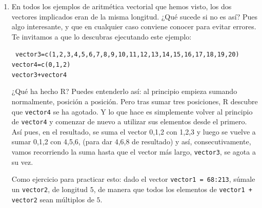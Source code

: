\documentclass[10pt,a4paper]{article}\usepackage[]{graphicx}\usepackage[]{color}
\begin{document}
\begin{enumerate}
  \addtocounter{enumi}{27}
  \item En todos los ejemplos de aritmética vectorial que hemos visto, los dos vectores implicados eran de la misma longitud. ¿Qué sucede si no es así? Pues algo interesante, y que en cualquier caso conviene conocer para evitar errores. Te invitamos a que lo descubras ejecutando este ejemplo:
    \begin{center}
    \begin{minipage}{12cm}
    {\tt
    vector3=c(1,2,3,4,5,6,7,8,9,10,11,12,13,14,15,16,17,18,19,20)\\
    vector4=c(0,1,2)\\
    vector3+vector4
    }
    \end{minipage}
    \end{center}
    ¿Qué ha hecho R? Puedes entenderlo así: al principio empieza sumando normalmente, posición a posición. Pero tras sumar tres posiciones, R descubre que {\tt vector4} se ha agotado. Y lo que hace es simplemente volver al principio de {\tt vector4} y comenzar de nuevo a utilizar sus elementos desde el primero. Así pues, en el resultado,  se suma el vector 0,1,2 con 1,2,3 y luego se vuelve a sumar 0,1,2 con 4,5,6, (para dar 4,6,8 de resultado) y así, consecutivamente, vamos recorriendo la suma hasta que el vector más largo, {\tt vector3}, se agota a su vez.

    Como ejercicio para practicar esto: dado el vector {\tt vector1 = 68:213}, súmale un {\tt vector2}, de longitud $5$, de manera que todos los elementos de {\tt vector1 + vector2} sean múltiplos de $5$.


\end{enumerate}
\end{document}
